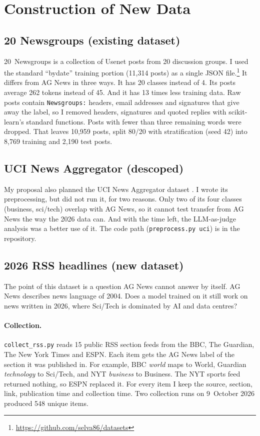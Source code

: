 \documentclass[11pt]{article}
\begin{document}
\section{Construction of New Data}

\subsection{20 Newsgroups (existing dataset)}
20~Newsgroups \citep{lang1995newsweeder} is a collection of Usenet posts from 20 discussion
groups. I used the standard ``bydate'' training portion (11,314 posts) as a single JSON
file.\footnote{\url{https://github.com/selva86/datasets}} It differs from AG News in three
ways. It has 20 classes instead of 4. Its posts average 262 tokens instead of 45. And it has
13 times less training data. Raw posts contain \texttt{Newsgroups:} headers, email
addresses and signatures that give away the label, so I removed headers, signatures and
quoted replies with scikit-learn's standard functions. Posts with fewer than three
remaining words were dropped. That leaves 10,959 posts, split 80/20 with stratification
(seed 42) into 8,769 training and 2,190 test posts.

\subsection{UCI News Aggregator (descoped)}
My proposal also planned the UCI News Aggregator dataset \citep{gasparetti2017uci}. I wrote
its preprocessing, but did not run it, for two reasons. Only two of its four classes
(business, sci/tech) overlap with AG News, so it cannot test transfer from AG News the way
the 2026 data can. And with the time left, the LLM-as-judge analysis was a better use of
it. The code path (\texttt{preprocess.py uci}) is in the repository.

\subsection{2026 RSS headlines (new dataset)}
The point of this dataset is a question AG News cannot answer by itself. AG News describes
news language of 2004. Does a model trained on it still work on news written in 2026,
where Sci/Tech is dominated by AI and data centres?

\paragraph{Collection.} \texttt{collect\_rss.py} reads 15 public RSS section feeds from
the BBC, The Guardian, The New York Times and ESPN. Each item gets the AG News label of the
section it was published in. For example, BBC \emph{world} maps to World, Guardian
\emph{technology} to Sci/Tech, and NYT \emph{business} to Business. The NYT sports feed
returned nothing, so ESPN replaced it. For every item I keep the source, section, link,
publication time and collection time. Two collection runs on 9~October 2026 produced 548
unique items.
\end{document}
